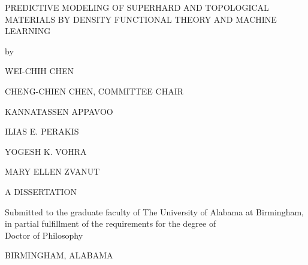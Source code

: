 	\frontmatter
    \begin{singlespace}
	{\centering
		PREDICTIVE MODELING OF SUPERHARD AND TOPOLOGICAL MATERIALS BY DENSITY FUNCTIONAL THEORY AND MACHINE LEARNING\par
	}
	\vskip 72pt
	{\centering
		by \par
	}
	\vskip 12pt
	{\centering
		WEI-CHIH CHEN
	\par
	}
	\vskip 24pt
	{\centering
		CHENG-CHIEN CHEN, COMMITTEE CHAIR
	\par
	}

	{\centering
		KANNATASSEN APPAVOO
	\par
	}
	{\centering
		ILIAS E. PERAKIS
	\par
	}
	{\centering
		YOGESH K. VOHRA
	\par
	}
	{\centering
		MARY ELLEN ZVANUT
	\par
	}
	\vspace{204pt}%
	{\centering
		A DISSERTATION
	\par
	}
	\vskip 12pt
	{\centering
		Submitted to the graduate faculty of The University of Alabama at Birmingham,\\
		in partial fulfillment of the requirements for the degree of\\ 
		Doctor of Philosophy
	\par
	}
	\vskip 12pt
	{\centering
		BIRMINGHAM, ALABAMA
	\par
	}
	\vskip 12pt		
	{
	\par
	}
    \end{singlespace}
    


